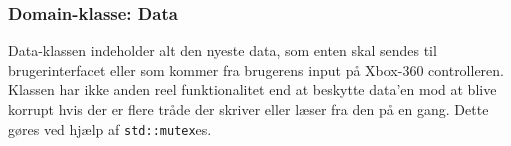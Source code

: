 \subsubsection{Domain-klasse: Data} \label{sec:data_klasse}

Data-klassen indeholder alt den nyeste data, som enten skal sendes til brugerinterfacet eller som kommer fra brugerens input på Xbox-360 controlleren. Klassen har ikke anden reel funktionalitet end at beskytte data'en mod at blive korrupt hvis der er flere tråde der skriver eller læser fra den på en gang. Dette gøres ved hjælp af \texttt{std::mutex}es.